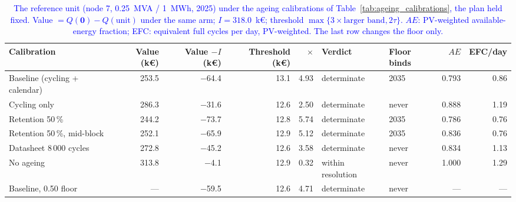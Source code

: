 \begin{table}[htbp!]
    \centering
    \caption{\textcolor{blue}{The reference unit (node 7, 0.25~MVA / 1~MWh, 2025) under the ageing calibrations of Table~\ref{tab:ageing_calibrations}, the plan held fixed. Value $= Q(\boldsymbol{0}) - Q(\text{unit})$ under the same arm; $I = 318.0$~k\euro; threshold $\max\{3 \times \text{larger band}, 2\tau\}$. $AE$: PV-weighted available-energy fraction; EFC: equivalent full cycles per day, PV-weighted. The last row changes the floor only.}}
    \label{tab:res_ageing}
    \scriptsize\setlength{\tabcolsep}{3pt}
    \begin{tabular}{l r r r r l l r r}
        \toprule
        Calibration & Value (k\euro) & Value $- I$ (k\euro) & Threshold (k\euro) & $\times$ & Verdict & Floor binds & $AE$ & EFC/day \\
        \midrule
        Baseline (cycling + calendar)   & 253.5 & $-$64.4 & 13.1 & 4.93 & determinate       & 2035  & 0.793 & 0.86 \\
        Cycling only                    & 286.3 & $-$31.6 & 12.6 & 2.50 & determinate       & never & 0.888 & 1.19 \\
        Retention 50\,\%                & 244.2 & $-$73.7 & 12.8 & 5.74 & determinate       & 2035  & 0.786 & 0.76 \\
        Retention 50\,\%, mid-block     & 252.1 & $-$65.9 & 12.9 & 5.12 & determinate       & 2035  & 0.836 & 0.76 \\
        Datasheet 8\,000 cycles         & 272.8 & $-$45.2 & 12.6 & 3.58 & determinate       & never & 0.834 & 1.13 \\
        No ageing                       & 313.8 & $-$4.1  & 12.9 & 0.32 & within resolution & never & 1.000 & 1.29 \\
        Baseline, 0.50 floor            & ---   & $-$59.5 & 12.6 & 4.71 & determinate       & never & ---   & --- \\
        \bottomrule
    \end{tabular}
\end{table}

